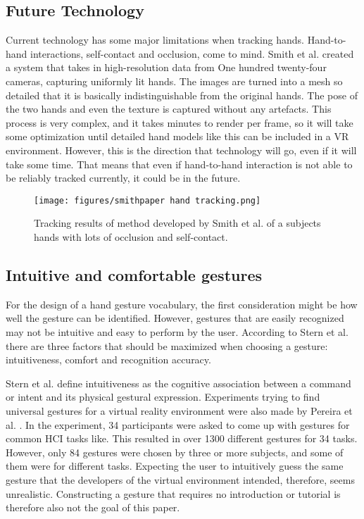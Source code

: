\subsection{Future Technology}\label{future-technology}

Current technology has some major limitations when tracking hands.
Hand-to-hand interactions, self-contact and occlusion, come to mind.
Smith et al. \cite{Smith} created a system that takes in high-resolution data from
One hundred twenty-four cameras, capturing uniformly lit hands. The images are turned into a
mesh so detailed that it is basically indistinguishable from the original
hands. The pose of the two hands and even the texture is captured without
any artefacts. This process is very complex, and it takes minutes to
render per frame, so it will take some optimization until detailed hand
models like this can be included in a VR environment. However, this is
the direction that technology will go, even if it will take some time.
That means that even if hand-to-hand interaction is not able to be
reliably tracked currently, it could be in the future.

\begin{figure}[hbt!]
  \centering
  \texttt{[image: figures/smithpaper hand tracking.png]}
  \caption{Tracking results of method developed by Smith et al. \cite{Smith} of a subjects hands with lots of occlusion and self-contact.}
  \label{fig:elixir}
\end{figure}


\subsection{Intuitive and comfortable gestures}\label{ergonomics}
For the design of a hand gesture vocabulary, the first consideration might be how well the gesture can be identified. However, gestures that are easily recognized may not be intuitive and easy to perform by the user. According to Stern et al. \cite{Stern2006} there are three factors that should be maximized when choosing a gesture: intuitiveness, comfort and recognition accuracy.

Stern et al. define intuitiveness as the cognitive association between a command or intent and its physical gestural expression. Experiments trying to find universal gestures for a virtual reality environment were also made by Pereira et al. \cite{Pereira2015}. In the experiment, 34 participants were asked to come up with gestures for common HCI tasks like. %
This resulted in over 1300 different gestures for 34 tasks. However, only 84 gestures were chosen by three or more subjects, and some of them were for different tasks. Expecting the user to intuitively guess the same gesture that the developers of the virtual environment intended, therefore, seems unrealistic. Constructing a gesture that requires no introduction or tutorial is therefore also not the goal of this paper.

